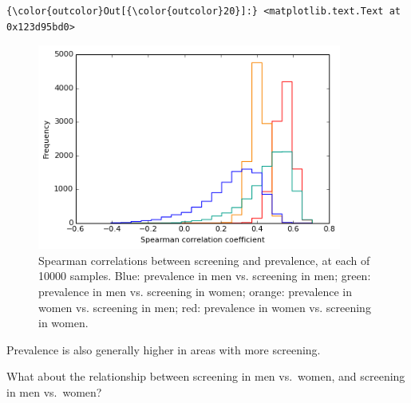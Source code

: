 \documentclass{article}
\begin{document}
    \begin{footnotesize}
            \begin{Verbatim}[commandchars=\\\{\}]
{\color{outcolor}Out[{\color{outcolor}20}]:} <matplotlib.text.Text at 0x123d95bd0>
\end{Verbatim}
    \end{footnotesize}
        
    \begin{figure}
        \begin{center}\includegraphics[width=10cm]{local_authorities_files/local_authorities_36_1.png}\end{center}
        \caption{Spearman correlations between screening and prevalence, at each of 10000 samples. Blue: prevalence in men vs. screening in men; green: prevalence in men vs. screening in women; orange: prevalence in women vs. screening in men; red: prevalence in women vs. screening in women.}
        \label{}
    \end{figure}
    
    Prevalence is also generally higher in areas with more screening.

What about the relationship between screening in men vs.~women, and
screening in men vs.~women?
\end{document}

